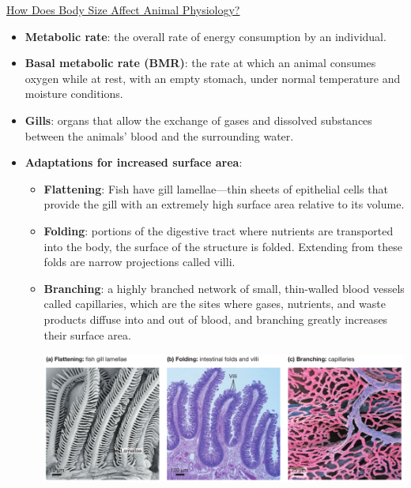 \documentclass[12pt,letterpaper]{article}
\begin{document}
\hypertarget{39.3}{}
\begin{secbox}{\hyperlink{39}{How Does Body Size Affect Animal Physiology?}}{
    \begin{itemize}
        \item \textbf{Metabolic rate}: the overall rate of energy consumption by an individual.
        \item \textbf{Basal metabolic rate (BMR)}: the rate at which an animal consumes oxygen while at rest, with an empty stomach, under normal temperature and moisture conditions.
        \item \textbf{Gills}:  organs that allow the exchange of gases and dissolved substances between the animals’ blood and the surrounding water.
        \item \textbf{Adaptations for increased surface area}:
        \begin{itemize}
            \item \textbf{Flattening}: Fish have gill lamellae---thin sheets of epithelial cells that provide the gill with an extremely high surface area relative to its volume.
            \item \textbf{Folding}: portions of the digestive tract where nutrients are transported into the body, the surface of the structure is folded. Extending from these folds are narrow projections called villi.
            \item \textbf{Branching}: a highly branched network of small, thin-walled blood vessels called capillaries, which are the sites where gases, nutrients, and waste products diffuse into and out of blood, and branching greatly increases their surface area.\par 
            \includegraphics[width=\linewidth]{images/gills.png}
        \end{itemize}
    \end{itemize}
}\end{secbox}
\end{document}

